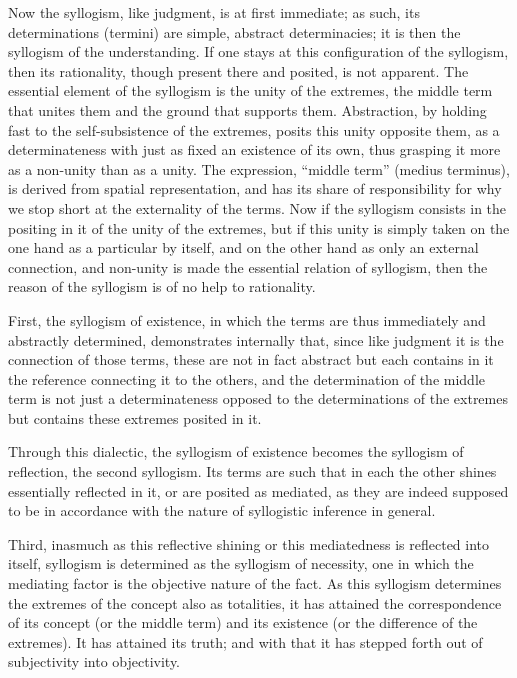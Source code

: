 Now the syllogism, like judgment, is at first immediate;
as such, its determinations (termini) are
simple, abstract determinacies;
it is then the syllogism of the understanding.
If one stays at this configuration of the syllogism,
then its rationality, though present there and posited,
is not apparent.
The essential element of the syllogism is
the unity of the extremes,
the middle term that unites them
and the ground that supports them.
Abstraction, by holding fast to
the self-subsistence of the extremes,
posits this unity opposite them,
as a determinateness with just as fixed
an existence of its own,
thus grasping it more as a non-unity than as a unity.
The expression, “middle term” (medius terminus),
is derived from spatial representation,
and has its share of responsibility for
why we stop short at the externality of the terms.
Now if the syllogism consists in
the positing in it of the unity of the extremes,
but if this unity is simply taken
on the one hand as a particular by itself,
and on the other hand as only an external connection,
and non-unity is made the essential relation of syllogism,
then the reason of the syllogism is of no help to rationality.

First, the syllogism of existence,
in which the terms are thus
immediately and abstractly determined,
demonstrates internally that,
since like judgment it is
the connection of those terms,
these are not in fact abstract
but each contains in it the reference
connecting it to the others,
and the determination of the middle term is
not just a determinateness opposed to the
determinations of the extremes
but contains these extremes posited in it.

Through this dialectic,
the syllogism of existence becomes
the syllogism of reflection, the second syllogism.
Its terms are such that in each the other
shines essentially reflected in it,
or are posited as mediated,
as they are indeed supposed to be
in accordance with the nature of
syllogistic inference in general.

Third, inasmuch as this reflective shining
or this mediatedness is reflected into itself,
syllogism is determined as the syllogism of necessity,
one in which the mediating factor is
the objective nature of the fact.
As this syllogism determines the extremes
of the concept also as totalities,
it has attained the correspondence
of its concept (or the middle term)
and its existence (or the difference of the extremes).
It has attained its truth;
and with that it has stepped forth
out of subjectivity into objectivity.

